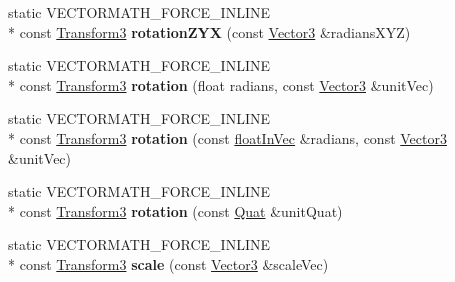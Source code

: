 \begin{DoxyCompactItemize}
\item 
\hypertarget{class_vectormath_1_1_aos_1_1_transform3_aad365810aad9f102e9cea050d30e6859}{static V\+E\+C\+T\+O\+R\+M\+A\+T\+H\+\_\+\+F\+O\+R\+C\+E\+\_\+\+I\+N\+L\+I\+N\+E \\*
const \hyperlink{class_vectormath_1_1_aos_1_1_transform3}{Transform3} {\bfseries rotation\+Z\+Y\+X} (const \hyperlink{class_vectormath_1_1_aos_1_1_vector3}{Vector3} \&radians\+X\+Y\+Z)}\label{class_vectormath_1_1_aos_1_1_transform3_aad365810aad9f102e9cea050d30e6859}

\item 
\hypertarget{class_vectormath_1_1_aos_1_1_transform3_a828430d04b8d99b8c6b6540d198834d9}{static V\+E\+C\+T\+O\+R\+M\+A\+T\+H\+\_\+\+F\+O\+R\+C\+E\+\_\+\+I\+N\+L\+I\+N\+E \\*
const \hyperlink{class_vectormath_1_1_aos_1_1_transform3}{Transform3} {\bfseries rotation} (float radians, const \hyperlink{class_vectormath_1_1_aos_1_1_vector3}{Vector3} \&unit\+Vec)}\label{class_vectormath_1_1_aos_1_1_transform3_a828430d04b8d99b8c6b6540d198834d9}

\item 
\hypertarget{class_vectormath_1_1_aos_1_1_transform3_a4d664f72ed4dfd6986004cb5bc15bd36}{static V\+E\+C\+T\+O\+R\+M\+A\+T\+H\+\_\+\+F\+O\+R\+C\+E\+\_\+\+I\+N\+L\+I\+N\+E \\*
const \hyperlink{class_vectormath_1_1_aos_1_1_transform3}{Transform3} {\bfseries rotation} (const \hyperlink{class_vectormath_1_1float_in_vec}{float\+In\+Vec} \&radians, const \hyperlink{class_vectormath_1_1_aos_1_1_vector3}{Vector3} \&unit\+Vec)}\label{class_vectormath_1_1_aos_1_1_transform3_a4d664f72ed4dfd6986004cb5bc15bd36}

\item 
\hypertarget{class_vectormath_1_1_aos_1_1_transform3_a477f22e7a915190292f72b2a1ba5a42a}{static V\+E\+C\+T\+O\+R\+M\+A\+T\+H\+\_\+\+F\+O\+R\+C\+E\+\_\+\+I\+N\+L\+I\+N\+E \\*
const \hyperlink{class_vectormath_1_1_aos_1_1_transform3}{Transform3} {\bfseries rotation} (const \hyperlink{class_vectormath_1_1_aos_1_1_quat}{Quat} \&unit\+Quat)}\label{class_vectormath_1_1_aos_1_1_transform3_a477f22e7a915190292f72b2a1ba5a42a}

\item 
\hypertarget{class_vectormath_1_1_aos_1_1_transform3_a6edc040c9a3f332f1ca9905c137f3bcc}{static V\+E\+C\+T\+O\+R\+M\+A\+T\+H\+\_\+\+F\+O\+R\+C\+E\+\_\+\+I\+N\+L\+I\+N\+E \\*
const \hyperlink{class_vectormath_1_1_aos_1_1_transform3}{Transform3} {\bfseries scale} (const \hyperlink{class_vectormath_1_1_aos_1_1_vector3}{Vector3} \&scale\+Vec)}\label{class_vectormath_1_1_aos_1_1_transform3_a6edc040c9a3f332f1ca9905c137f3bcc}


\end{DoxyCompactItemize}
